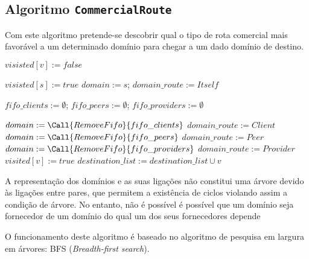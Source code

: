 \documentclass{article}
\begin{document}

\setcounter{page}{1}

\subsection{Algoritmo \texttt{CommercialRoute}}

Com este algoritmo pretende-se descobrir qual o tipo de rota comercial mais favorável a um determinado domínio para chegar a um dado domínio de destino.

\begin{algorithm}[H]
\caption{}
\label{al:generatecode}
\begin{algorithmic}
		\State $visisted[v] := false$
	\EndFor
	
	\State $visisted[s] := true$
	\State $domain := s$; $domain\_route := Itself$
	
	\State $fifo\_clients := \emptyset$; 
	$fifo\_peers := \emptyset$;
	$fifo\_providers := \emptyset$
	
	\State
	

		\State{}
				
			\State{}			
			\State{}
		\EndIf
		
		\State{}
		\State
		\State $domain := \Call{RemoveFifo}{fifo\_clients}$
		\State $domain\_route := Client$
			\State $domain := \Call{RemoveFifo}{fifo\_peers}$
			\State $domain\_route := Peer$
				\State $domain := \Call{RemoveFifo}{fifo\_providers}$
				\State $domain\_route := Provider$
			\EndIf
		\EndIf		
	\EndWhile
\EndFunction
\State
{}
			\State $visited[v] := true$
			\State $destination\_list := destination\_list \cup v$
		\EndIf			
	\EndFor
\EndFunction
\end{algorithmic}
\end{algorithm}

A representação dos domínios e as suas ligações não constitui uma árvore devido às ligações entre pares, que permitem a existência de ciclos violando assim a condição de árvore. No entanto, não é possível é possível que um domínio seja fornecedor de um domínio do qual um dos seus fornecedores depende




O funcionamento deste algoritmo é baseado no algoritmo de pesquisa em largura em árvores: BFS (\textit{Breadth-first search}).
\end{document}
